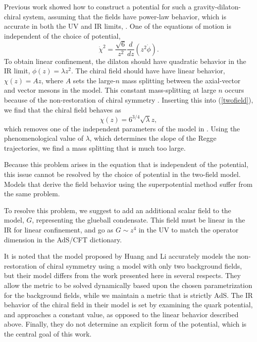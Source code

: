 \documentclass[12pt]{article}
\newcommand{\be}{\begin{equation}}
\newcommand{\ee}{\end{equation}}
\def\Dz{\frac{d}{dz}}
\def\phidot{\dot{\phi}}
\def\chidot{\dot{\chi}}
\def\rt6{\sqrt{6}}
\begin{document}
Previous work showed how to construct a potential for such a gravity-dilaton-chiral system, assuming that the fields have power-law behavior, which is accurate in both the UV and IR limits, \cite{Springer 2010}. 
One of the equations of motion is independent of the choice of potential,
\be
\chidot^2  = \frac{\rt6}{z^2} \Dz(z^2\phidot). 
\label{twofield}
\ee
To obtain linear confinement, the dilaton should have quadratic behavior in the IR limit, $\phi(z)=\lambda z^2$.
The chiral field should have have linear behavior, $\chi(z)=A z$, where $A$ sets the large-$n$ mass splitting between the axial-vector and vector mesons in the model. 
This constant mass-splitting at large $n$ occurs because of the non-restoration of chiral symmetry \cite{Shifman-2008}.
Inserting this into (\ref{twofield}), we find that the chiral field behaves as
\be
\chi(z)=6^{3/4}\sqrt{\lambda}z,
\ee
which removes one of the independent parameters of the model in \cite{Gherghetta2009}. 
Using the phenomenological value of $\lambda$, which determines the slope of the Regge trajectories, we find a mass splitting that is much too large.

Because this problem arises in the equation that is independent of the potential, this issue cannot be resolved by the choice of potential in the two-field model. 
Models that derive the field behavior using the superpotential method suffer from the same problem.

To resolve this problem, we suggest to add an additional scalar field to the model, $G$, representing the glueball condensate. 
This field must be linear in the IR for linear confinement, and go as $G \sim z^4$ in the UV to match the operator dimension in the AdS/CFT dictionary.

It is noted that the model proposed by Huang and Li \cite{Li2013, Li2013a} accurately models the non-restoration of chiral symmetry using a model with only two background fields, but their model differs from the work presented here in several respects.
They allow the metric to be solved dynamically based upon the chosen parametrization for the background fields, while we maintain a metric that is strictly AdS.
The IR behavior of the chiral field in their model is set by examining the quark potential, and approaches a constant value, as opposed to the linear behavior described above.
Finally, they do not determine an explicit form of the potential, which is the central goal of this work.
\end{document}
